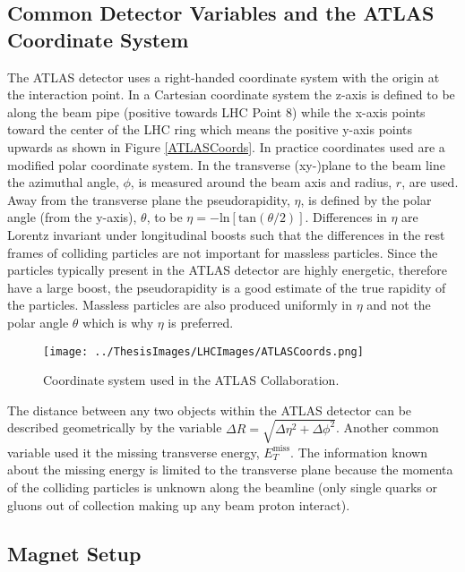 \subsection{Common Detector Variables and the ATLAS Coordinate System}
The ATLAS detector uses a right-handed coordinate system with the origin at the interaction point.  In a Cartesian coordinate system the z-axis is defined to be along the beam pipe (positive towards LHC Point 8) while the x-axis points toward the center of the LHC ring which means the positive y-axis points upwards as shown in Figure \ref{ATLASCoords}.  In practice coordinates used are a modified polar coordinate system.  In the transverse (xy-)plane to the beam line the azimuthal angle, $\phi$, is measured around the beam axis and radius, $r$, are used.  Away from the transverse plane the pseudorapidity, $\eta$, is defined by the polar angle (from the y-axis), $\theta$, to be $\eta= -\text{ln}[\text{tan}(\theta/2)]$.  Differences in $\eta$ are Lorentz invariant under longitudinal boosts such that the differences in the rest frames of colliding particles are not important for massless particles.  Since the particles typically present in the ATLAS detector are highly energetic, therefore have a large boost, the pseudorapidity is a good estimate of the true rapidity of the particles.  Massless particles are also produced uniformly in $\eta$ and not the polar angle $\theta$ which is why $\eta$ is preferred.

\begin{figure}[h!]
	\centering
	\texttt{[image: ../ThesisImages/LHCImages/ATLASCoords.png]}
	\caption[Coordinate system used in the ATLAS Collaboration.]{Coordinate system used in the ATLAS Collaboration.\cite{ATLASCoords}
	}
	\label{fig:ATLASCoords}
\end{figure}

The distance between any two objects within the ATLAS detector can be described geometrically by the variable $\Delta R = \sqrt{\Delta \eta^2 + \Delta \phi^2}$.  Another common variable used it the missing transverse energy, $E^{\text{miss}}_T$.  The information known about the missing energy is limited to the transverse plane because the momenta of the colliding particles is unknown along the beamline (only single quarks or gluons out of collection making up any beam proton interact).




\subsection{Magnet Setup}
\label{sec:ATLASMagnet}

